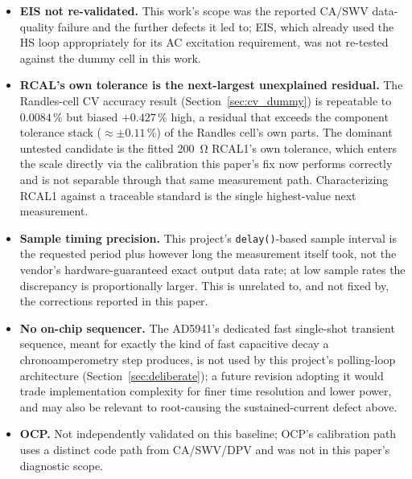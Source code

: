 \begin{itemize}
  polymorphic \texttt{C\_ElectrochemicalMethod} hierarchy, and eliminating
  the triplicated configuration logic -- verified against this paper's own
  unchanged CV accuracy result after the refactor
  (Section~\ref{sec:validation}). This is not the same claim as a
  maximally-abstracted architecture: there remains exactly one inheritance
  level, no call site dispatches through a base-class pointer (each
  \texttt{Dispatch<Method>()} still names its concrete class), and
  \texttt{C\_DataStorage}'s new accessors are mechanical get/set pairs, not
  a richer domain interface. The paper's claim is scoped to what the audit
  actually measured -- encapsulation, inheritance/polymorphism, and
  duplication -- not to architectural maturity in general.
\item \textbf{EIS not re-validated.} This work's scope was the reported
  CA/SWV data-quality failure and the further defects it led to; EIS,
  which already used the HS loop appropriately for its AC excitation
  requirement, was not re-tested against the dummy cell in this work.
\item \textbf{RCAL's own tolerance is the next-largest unexplained
  residual.} The Randles-cell CV accuracy result
  (Section~\ref{sec:cv_dummy}) is repeatable to $0.0084\,\%$ but biased
  $+0.427\,\%$ high, a residual that exceeds the component tolerance
  stack ($\approx\pm0.11\,\%$) of the Randles cell's own parts. The
  dominant untested candidate is the fitted \SI{200}{\ohm} RCAL1's own
  tolerance, which enters the scale directly via the calibration this
  paper's fix now performs correctly and is not separable through that
  same measurement path. Characterizing RCAL1 against a traceable
  standard is the single highest-value next measurement.
\item \textbf{Sample timing precision.} This project's \texttt{delay()}-based
  sample interval is the requested period plus however long the
  measurement itself took, not the vendor's hardware-guaranteed exact
  output data rate; at low sample rates the discrepancy is proportionally
  larger. This is unrelated to, and not fixed by, the corrections
  reported in this paper.
\item \textbf{No on-chip sequencer.} The AD5941's dedicated fast
  single-shot transient sequence, meant for exactly the kind of fast
  capacitive decay a chronoamperometry step produces, is not used by this
  project's polling-loop architecture (Section~\ref{sec:deliberate}); a
  future revision adopting it would trade implementation complexity for
  finer time resolution and lower power, and may also be relevant to
  root-causing the sustained-current defect above.
\item \textbf{OCP.} Not independently validated on this baseline; OCP's
  calibration path uses a distinct code path from CA/SWV/DPV and was not
  in this paper's diagnostic scope.
\end{itemize}
